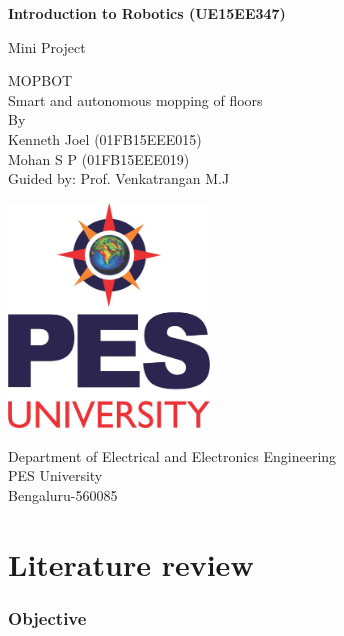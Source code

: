 \documentclass[12pt]{article}
\begin{document}
\begin{titlepage}
    \begin{center}
        \vspace*{1cm}
        
        \Large
        \textbf{Introduction to Robotics (UE15EE347)}
        
        \vspace{0.5cm}
        \LARGE
        Mini Project
        \vspace{0.5cm}
        
MOPBOT\\
Smart and autonomous mopping of floors\\
\vspace{0.5cm}
By\\
Kenneth Joel (01FB15EEE015)\\
Mohan S P (01FB15EEE019)\\

        \vspace{0.8cm}
Guided by: Prof. Venkatrangan M.J
        
        \includegraphics[width=0.4\textwidth]{university.jpg}
        
        \Large
        Department of Electrical and Electronics Engineering\\
        PES University\\
        Bengaluru-560085\\
    \end{center}
\end{titlepage}
 
\tableofcontents

\newpage

\part{Literature review}

\section{Objective}
\end{document}
